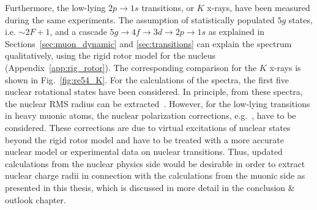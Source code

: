%
%
%
Furthermore, the low-lying $2p\rightarrow1s$ transitions, or $K$ x-rays, have been measured during the same experiments. The assumption of statistically populated $5g$ states, i.e. $\sim 2F+1$, and a cascade $5g\rightarrow 4f \rightarrow 3d \rightarrow 2p \rightarrow 1s$ as explained in Sections~\ref{sec:muon_dynamic} and \ref{sec:transitions} can explain the spectrum qualitatively, using the rigid rotor model for the nucleus (Appendix~\ref{app:rig_rotor}). The corresponding comparison for the $K$ x-rays is shown in Fig.~\ref{fig:re54_K}. For the calculations of the spectra, the first five nuclear rotational states have been considered. In principle, from these spectra, the nuclear RMS radius can be extracted~\cite{hitlin1970}. However, for the low-lying transitions in heavy muonic atoms, the nuclear polarization corrections, e.g.~\cite{chen1970}, have to be considered. These corrections are due to virtual excitations of nuclear states beyond the rigid rotor model and have to be treated with a more accurate nuclear model or experimental data on nuclear transitions. Thus, updated calculations from the nuclear physics side would be desirable in order to extract nuclear charge radii in connection with the calculations from the muonic side as presented in this thesis, which is discussed in more detail in the conclusion \& outlook chapter.
